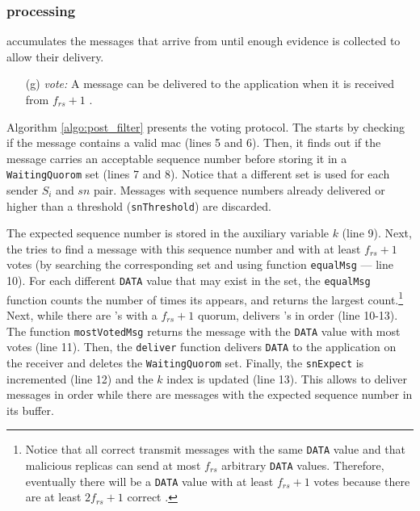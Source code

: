 \subsubsection{\Postsieve processing}

\Postsieve accumulates the messages that arrive from \repsieves until enough evidence is collected to allow their delivery.

\begin{enumerate}
\item[(g)] \textit{vote:} A message can be delivered to the application when it is received from $f_{rs} + 1$ \repsieves.

\end{enumerate}

Algorithm \ref{algo:post_filter} presents the \postsieve voting protocol.
The \postsieve starts by checking if the message contains a valid \gls{mac} (lines 5 and 6).
Then, it finds out if the message carries an acceptable sequence number before storing it in a \texttt{WaitingQuorom} set (lines 7 and 8).
Notice that a different set is used for each sender $S_i$ and $sn$ pair.
Messages with sequence numbers already delivered or higher than a threshold (\texttt{snThreshold}) are discarded.

The expected sequence number is stored in the auxiliary variable $k$ (line 9).
Next, the \postsieve tries to find a message with this sequence number and with at least $f_{rs} + 1$ votes (by searching the corresponding set and using function \texttt{equalMsg} --- line 10).
For each different \texttt{DATA} value that may exist in the set, the \texttt{equalMsg} function counts the number of times its appears, and returns the largest count.\footnote{Notice that all correct \repsieves transmit messages with the same \texttt{DATA} value and that malicious replicas can send at most $f_{rs}$ arbitrary \texttt{DATA} values.
Therefore, eventually there will be a \texttt{DATA} value with at least $f_{rs}+1$ votes because there are at least $2f_{rs}+1$ correct \repsieves.}
Next, while there are \msg's with a $f_{rs} + 1$ quorum, \postsieve delivers \msg's in order (line 10-13).
The function \texttt{mostVotedMsg} returns the message with the \texttt{DATA} value with most votes (line 11).
Then, the \texttt{deliver} function delivers \texttt{DATA} to the application on the receiver and deletes the \texttt{WaitingQuorom} set.
Finally, the \texttt{snExpect} is incremented (line 12) and the $k$ index is updated (line 13).
This allows \postsieve to deliver messages in order while there are messages with the expected sequence number in its buffer.


